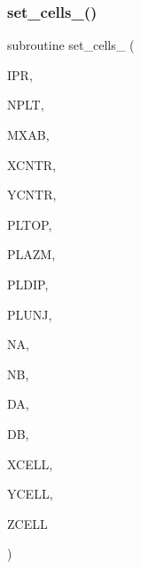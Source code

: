 \subsubsection{\texorpdfstring{set\+\_\+cells\+\_()}{set\_cells\_2()}}
{\footnotesize\ttfamily subroutine set\+\_\+cells\+\_ (\begin{DoxyParamCaption}\item[{integer}]{I\+PR,  }\item[{integer}]{N\+P\+LT,  }\item[{integer}]{M\+X\+AB,  }\item[{real, dimension(nplt)}]{X\+C\+N\+TR,  }\item[{real, dimension(nplt)}]{Y\+C\+N\+TR,  }\item[{real, dimension(nplt)}]{P\+L\+T\+OP,  }\item[{real, dimension(nplt)}]{P\+L\+A\+ZM,  }\item[{real, dimension(nplt)}]{P\+L\+D\+IP,  }\item[{real, dimension(nplt)}]{P\+L\+U\+NJ,  }\item[{integer, dimension(nplt)}]{NA,  }\item[{integer, dimension(nplt)}]{NB,  }\item[{real, dimension(nplt)}]{DA,  }\item[{real, dimension(nplt)}]{DB,  }\item[{real, dimension(mxab,nplt)}]{X\+C\+E\+LL,  }\item[{real, dimension(mxab,nplt)}]{Y\+C\+E\+LL,  }\item[{real, dimension(mxab,nplt)}]{Z\+C\+E\+LL }\end{DoxyParamCaption})}

